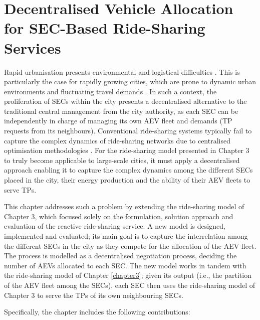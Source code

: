 \chapter{Decentralised Vehicle Allocation for SEC-Based Ride-Sharing Services}
\label{chapter4}
Rapid urbanisation presents environmental and logistical difficulties \cite{Reference151}. This is particularly the case for rapidly growing cities, which are prone to dynamic urban environments and fluctuating travel demands \cite{Reference3020}. In such a context, the proliferation of SECs within the city presents a decentralised alternative to the traditional central management from the city authority, as each SEC can be independently in charge of managing its own AEV fleet and demands (TP requests from its neighbours).
Conventional ride-sharing systems typically fail to capture the complex dynamics of ride-sharing networks due to centralised optimisation methodologies \cite{Reference1,Reference2,Reference4,Reference6}. For the ride-sharing model presented in Chapter 3 to truly become applicable to large-scale cities, it must apply a decentralised approach enabling it to capture the complex dynamics among the different SECs placed in the city, their energy production and the ability of their AEV fleets to serve TPs. 

This chapter addresses such a problem by extending the ride-sharing model of Chapter 3, which focused solely on the formulation, solution approach and evaluation of the reactive ride-sharing service. A new model is designed, implemented and evaluated; its main goal is to capture the interrelation among the different SECs in the city as they compete for the allocation of the AEV fleet. The process is modelled as a decentralised negotiation process, deciding the number of AEVs allocated to each SEC. The new model works in tandem with the ride-sharing model of Chapter \ref{chapter3}; given its output (i.e., the partition of the AEV fleet among the SECs), each SEC then uses the ride-sharing model of Chapter 3 to serve the TPs of its own neighbouring SECs.

Specifically, the chapter includes the following contributions:

